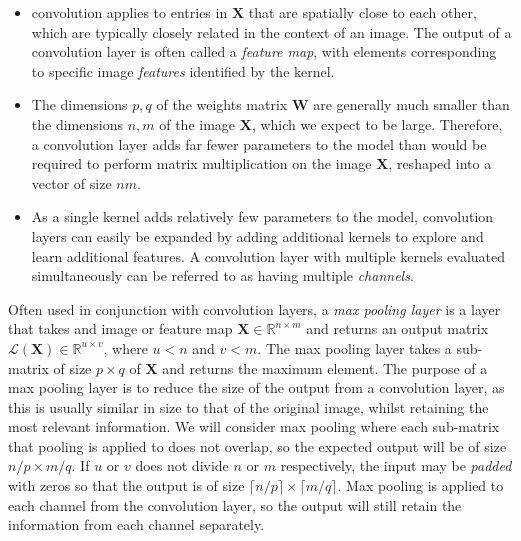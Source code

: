 \documentclass{somasmsc}
\begin{document}
\begin{itemize}
    \item convolution applies to entries in $\mathbf{X}$ that are spatially close to each other, which are typically closely related in the context of an image. The output of a convolution layer is often called a \textit{feature map}, with elements corresponding to specific image \textit{features} identified by the kernel.
    \item The dimensions $p,q$ of the weights matrix $\mathbf{W}$ are generally much smaller than the dimensions $n, m$ of the image $\mathbf{X}$, which we expect to be large. Therefore, a convolution layer adds far fewer parameters to the model than would be required to perform matrix multiplication on the image $\mathbf{X}$, reshaped into a vector of size $nm$.
    \item As a single kernel adds relatively few parameters to the model, convolution layers can easily be expanded by adding additional kernels to explore and learn additional features. A convolution layer with multiple kernels evaluated simultaneously can be referred to as having multiple \textit{channels}.
\end{itemize}

Often used in conjunction with convolution layers, a \textit{max pooling layer} is a layer that takes and image or feature map $\mathbf{X} \in \mathbb{R}^{n \times m}$ and returns an output matrix $\mathcal{L}\left(\mathbf{X}\right) \in \mathbb{R}^{u \times v}$, where $u < n$ and $v < m$. The max pooling layer takes a sub-matrix of size $p \times q$ of $\mathbf{X}$ and returns the maximum element. The purpose of a max pooling layer is to reduce the size of the output from a convolution layer, as this is usually similar in size to that of the original image, whilst retaining the most relevant information. We will consider max pooling where each sub-matrix that pooling is applied to does not overlap, so the expected output will be of size $n/p \times m/q$. If $u$ or $v$ does not divide $n$ or $m$ respectively, the input may be \textit{padded} with zeros so that the output is of size $\lceil n/p \rceil \times \lceil m/q \rceil$. Max pooling is applied to each channel from the convolution layer, so the output will still retain the information from each channel separately.
\end{document}
